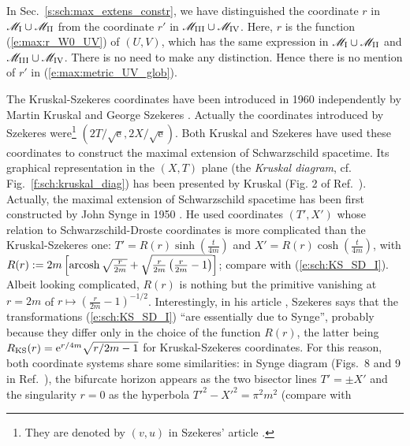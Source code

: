 \begin{remark}
In Sec.~\ref{s:sch:max_extens_constr}, we have distinguished the
coordinate
$r$ in $\mathscr{M}_{\rm I}\cup \mathscr{M}_{\rm II}$ from the coordinate $r'$ in
$\mathscr{M}_{\rm III}\cup \mathscr{M}_{\rm IV}$. Here, $r$ is the function
(\ref{e:max:r_W0_UV}) of $(U,V)$, which has the same expression in
$\mathscr{M}_{\rm I}\cup \mathscr{M}_{\rm II}$ and $\mathscr{M}_{\rm III}\cup \mathscr{M}_{\rm IV}$. There is
no need to make any distinction. Hence there is no mention of $r'$
in (\ref{e:max:metric_UV_glob}).
\end{remark}


\begin{hist}
\label{n:max:KS_coord}
The Kruskal-Szekeres coordinates have been introduced in 1960 independently
by Martin Kruskal \cite{Krusk60} and
George Szekeres \cite{Szeke60}.
Actually the coordinates
introduced by Szekeres were\footnote{They are denoted by $(v,u)$ in Szekeres' article \cite{Szeke60}.} $(2T/\sqrt{\mathrm{e}}, 2X/\sqrt{\mathrm{e}})$. Both Kruskal and Szekeres
have used these coordinates to construct the maximal  extension of Schwarzschild
spacetime. Its graphical representation in the $(X,T)$ plane (the
\emph{Kruskal diagram}, cf. Fig.~\ref{f:sch:kruskal_diag}) has been presented by
Kruskal (Fig. 2 of Ref.~\cite{Krusk60}).
Actually, the maximal extension of Schwarzschild spacetime has been first constructed
by John Synge in 1950 \cite{Synge50}. He used coordinates
$(T',X')$
whose relation to
Schwarzschild-Droste coordinates is more complicated than the Kruskal-Szekeres one:
$T' = R(r) \sinh \left(\frac{t}{4m}\right)$
and $X' = R(r) \cosh \left(\frac{t}{4m}\right)$, with
$R(r) := 2m \left[ \operatorname{arcosh}\sqrt{\frac{r}{2m}} + \sqrt{ \frac{r}{2m}\left(\frac{r}{2m} - 1 \right) }\right]$; compare with (\ref{e:sch:KS_SD_I}).
Albeit looking complicated, $R(r)$ is nothing but the primitive vanishing at
$r=2m$ of $r\mapsto \left(\frac{r}{2m} - 1 \right) ^{-1/2}$.
Interestingly, in his
article \cite{Szeke60}, Szekeres says that the transformations (\ref{e:sch:KS_SD_I})
``are essentially due to Synge'', probably because they differ only in the choice
of the function $R(r)$, the latter being
$R_{\rm KS}(r) = \mathrm{e}^{r/4m} \sqrt{r/2m-1}$ for Kruskal-Szekeres coordinates.
For this reason, both coordinate systems share some similarities: in Synge diagram (Figs.~8 and 9 in Ref.~\cite{Synge50}),
the bifurcate horizon appears as the two bisector lines $T' = \pm X'$ and
the singularity $r=0$ as the hyperbola $T'^2 - X'^2 = \pi^2 m^2$ (compare with

\end{hist}

